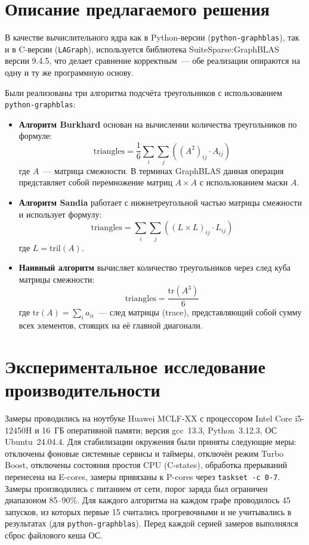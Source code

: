 \documentclass[a4paper]{article}
\begin{document}
\section{Описание предлагаемого решения}

В качестве вычислительного ядра как в Python-версии (\texttt{python-graphblas}), так и в C-версии (\texttt{LAGraph}), используется библиотека SuiteSparse:GraphBLAS версии 9.4.5, что делает сравнение корректным~--- обе реализации опираются на одну и ту же программную основу.

Были реализованы три алгоритма подсчёта треугольников с использованием \texttt{python-graphblas}:
\begin{itemize}
    \item \textbf{Алгоритм Burkhard} основан на вычислении количества треугольников по формуле:
    \[
    \text{triangles} = \frac{1}{6} \sum_{i} \sum_{j} \left( (A^2)_{ij} \cdot A_{ij} \right)
    \]
    где $A$~--- матрица смежности. В терминах GraphBLAS данная операция представляет собой перемножение матриц $A \times A$ с использованием маски $A$.
    
    \item \textbf{Алгоритм Sandia} работает с нижнетреугольной частью матрицы смежности и использует формулу:
    \[
    \text{triangles} = \sum_{i} \sum_{j} \left( (L \times L)_{ij} \cdot L_{ij} \right)
    \]
    где $L = \text{tril}(A)$.
    
    \item \textbf{Наивный алгоритм} вычисляет количество треугольников через след куба матрицы смежности:
    \[
    \text{triangles} = \frac{\text{tr}(A^3)}{6}
    \]
    где $\text{tr}(A) = \sum_{i} a_{ii}$~--- след матрицы (trace), представляющий собой сумму всех элементов, стоящих на её главной диагонали.
\end{itemize}
\section{Экспериментальное исследование производительности}

Замеры проводились на ноутбуке Huawei MCLF-XX с процессором Intel Core i5-12450H и 16~ГБ оперативной памяти; версия gcc~13.3, Python~3.12.3, ОС Ubuntu~24.04.4.
Для стабилизации окружения были приняты следующие меры: отключены фоновые системные сервисы и таймеры, отключён режим Turbo Boost, отключены состояния простоя CPU (C-states), обработка прерываний перенесена на E-cores, замеры привязаны к P-cores через \texttt{taskset -c 0-7}.
Замеры производились с питанием от сети, порог заряда был ограничен диапазоном 85--90\%.
Для каждого алгоритма на каждом графе проводилось 45 запусков, из которых первые 15 считались прогревочными и не учитывались в результатах (для \texttt{python-graphblas}).
Перед каждой серией замеров выполнялся сброс файлового кеша ОС.
\end{document}

